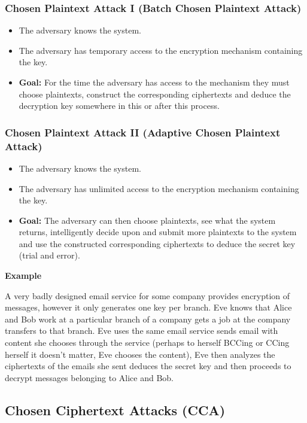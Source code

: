 \subsubsection*{Chosen Plaintext Attack I (Batch Chosen Plaintext Attack)}

\begin{itemize}
\item The adversary knows the system.
\item The adversary has temporary access to the encryption mechanism containing the key.
\item \textbf{Goal:} For the time the adversary has access to the mechanism they must choose plaintexts, construct the corresponding ciphertexts and deduce the decryption key somewhere in this or after this process.
\end{itemize}



\subsubsection*{Chosen Plaintext Attack II (Adaptive Chosen Plaintext Attack)}

\begin{itemize}
\item The adversary knows the system.
\item The adversary has unlimited access to the encryption mechanism containing the key.
\item \textbf{Goal:} The adversary can then choose plaintexts, see what the system returns, intelligently decide upon and submit more plaintexts to the system and use the constructed corresponding ciphertexts to deduce the secret key (trial and error).
\end{itemize}

\textbf{Example}


A very badly designed email service for some company provides encryption of messages, however it only generates one key per branch.
Eve knows that Alice and Bob work at a particular branch of a company gets a job at the company transfers to that branch. 
Eve uses the same email service sends email with content she chooses through the service (perhaps to herself BCCing or CCing herself it doesn’t matter, Eve chooses the content), Eve then analyzes the ciphertexts of the emails she sent deduces the secret key and then proceeds to decrypt messages belonging to Alice and Bob. 




\subsection{Chosen Ciphertext Attacks (CCA)}



